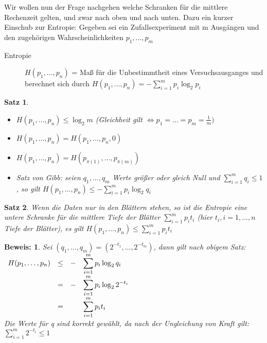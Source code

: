 \documentclass[ngerman,draft,parskip=half*,twoside]{scrreprt}
\theoremstyle{break}
\newtheorem{satz}{Satz}[chapter]
\theoremstyle{nonumberbreak}
\newtheorem{beweis}{Beweis:}
\begin{document}
Wir wollen nun der Frage nachgehen welche Schranken für die mittlere Rechenzeit gelten, und zwar nach oben und nach unten.
Dazu ein kurzer Einschub zur Entropie:
Gegeben sei ein Zufallsexperiment mit m Ausgängen und den zugehörigen Wahrscheinlichkeiten $p_1,\ldots,p_m$
\begin{description}
    \item[Entropie] $H(p_1,\ldots,p_n)$ = Maß für die Unbestimmtheit eines Versuchsausganges und berechnet sich durch
     $H(p_1,\ldots,p_n)=-\sum_{i=1}^m p_i\log_2 p_i$
\end{description}

\begin{satz}
 \begin{itemize}
    \item $H(p_1,\ldots,p_n)\leq\log_2 m$ (Gleichheit gilt
      $\Leftrightarrow p_1=\ldots=p_m=\frac{1}{m})$
    \item $H(p_1,\ldots,p_n) = H(p_1,\ldots,p_n,0)$
    \item $H(p_1,\ldots,p_n)=H(p_{\pi(1)},\ldots,p_{\pi(m)})$
    \item Satz von Gibb: seien $q_1,\ldots,q_m$ Werte größer oder gleich Null und $\sum_{i=1}^m q_i\leq1$, so gilt
     $H(p_1,\ldots,p_n)\leq-\sum_{i=1}^m p_i\log_2q_i$
 \end{itemize}
\end{satz}

\begin{satz}
 Wenn die Daten nur in den Blättern stehen, so ist die Entropie eine untere Schranke für die mittlere Tiefe
 der Blätter $\sum_{i=1}^m p_i t_i$ (hier $t_i,i=1,\ldots,n$ Tiefe der Blätter), es gilt
 $H(p_1,\ldots,p_n)\leq\sum_{i=1}^m p_it_i$
\end{satz}
\begin{beweis}
Sei $(q_1,\ldots,q_m)=(2^{-t_1},\ldots,2^{-t_m})$, dann gilt nach obigem Satz:\\
$\begin{array}{cccl}
  H(p_1,\ldots,p_n) & \leq & - &\displaystyle\sum_{i=1}^m p_i\log_2q_i \vspace{0.3mm}\\
                 & =    & - &\displaystyle\sum_{i=1}^m p_i\log_22^{-t_i} \vspace{0.3mm}\\
                 & =    &   &\displaystyle\sum_{i=1}^m p_it_i \\
\end{array}$\\
Die Werte für q sind korrekt gewählt, da nach der Ungleichung von Kraft gilt: $\sum_{i=1}^m 2^{-t_i}\leq1$
\end{beweis}
\end{document}
